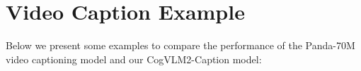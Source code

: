 \section{Video Caption Example}
\label{ap:video_caption_example}
Below we present some examples to compare the performance of the Panda-70M video captioning model and our CogVLM2-Caption model:


% 


% 



